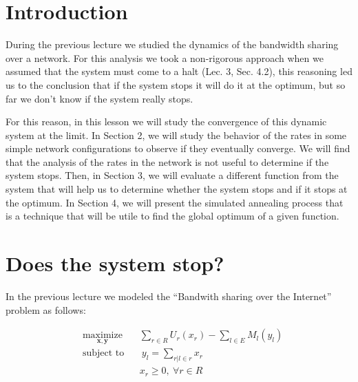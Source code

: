 

\newcommand{\x}{\mathbf{x}}
\newcommand{\y}{\mathbf{y}}
\newcommand{\z}{\mathbf{z}}
\newcommand{\blambda}{\boldsymbol{\lambda}}
\newcommand{\bmu}{\boldsymbol{\nu}}
\usepackage{color}
\usepackage{tikz}
\usepackage{pgfplots}
\usetikzlibrary{positioning}
\usetikzlibrary{arrows}
\usepackage[margin=1in]{geometry}
\usepackage{multirow,booktabs}
\usepackage{dsfont}
\usepackage{subfig}
\usepackage{algorithm}
\usepackage[noend]{algpseudocode}
\graphicspath{ {images/} }




\section{Introduction}
During the previous lecture we studied the dynamics of the bandwidth sharing over a network. For this analysis we took a non-rigorous approach when we assumed that the system must come to a halt (Lec. 3, Sec. 4.2), this reasoning led us to the conclusion that if the system stops it will do it at the optimum, but so far we don't know if the system really stops.

For this reason, in this lesson we will study the convergence of this dynamic system at the limit. In Section 2, we will study the behavior of the rates in some simple network configurations to observe if they eventually converge. We will find that the analysis of the rates in the network is not useful to determine if the system stops. Then, in Section 3, we will evaluate a different function from the system that will help us to determine whether the system stops and if it stops at the optimum.
In Section 4, we will present the simulated annealing process that is a technique that will be utile to find the global optimum of a given function.

\section{Does the system stop?}

In the previous lecture we modeled the ``Bandwith sharing over the Internet'' problem as follows:

\begin{equation}
\begin{aligned}
& \underset{\x , \y }{\text{maximize}}
& &  \sum_{r \in R} U_{r}(x_{r})- \sum_{l \in E} M_{l}(y_{l})\\
& \text{subject to}
& & \ y_l=\sum\limits_{r | l \in r} x_r \\
&      &&  x_{r} \geq 0,\ \forall r \in R\\
\end{aligned}
\label{eq1}
\end{equation}

